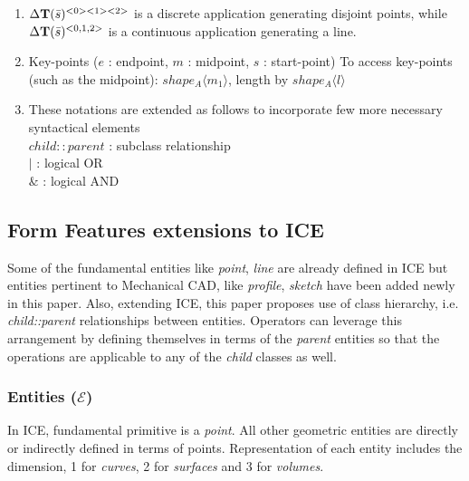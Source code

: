 \begin{enumerate}
	\item $\Delta {\bf T}(\bar{s})^{<0><1><2>}$  is  a  discrete  application  generating disjoint points, while  $\Delta  {\bf T}(\bar{s})^{<0,1,2>}$  is a continuous application generating a line.  

	\item Key-points ($ e$ : endpoint,   $m$ : midpoint,   $s$ : start-point) To access key-points (such as the midpoint): $ shape_A \langle m_1 \rangle$, length by $shape_A \langle l \rangle$

	\item These notations are extended as follows to incorporate few more necessary syntactical elements\\
		$child::parent$ : subclass relationship\\
		$|$ : logical OR\\
		$\&$ : logical AND\\
\end{enumerate}

\subsection{Form Features extensions to ICE}

Some of the fundamental entities like {\em point}, {\em line} are already defined in ICE but entities pertinent to Mechanical CAD, like {\em profile}, {\em sketch} have been added newly in this paper. Also, extending ICE, this paper proposes use of class hierarchy, i.e. {\em child::parent} relationships between entities. Operators can leverage this arrangement by defining themselves in terms of the {\em parent} entities so that the operations are  applicable to any of the {\em child} classes as well.


\subsubsection{Entities ($\mathcal{E}$)}
In ICE, fundamental primitive is a {\em point}. All other geometric  entities are directly or indirectly defined in terms of points. Representation of each entity includes the dimension, 1 for {\em curves}, 2 for {\em surfaces} and 3 for {\em volumes}. 

